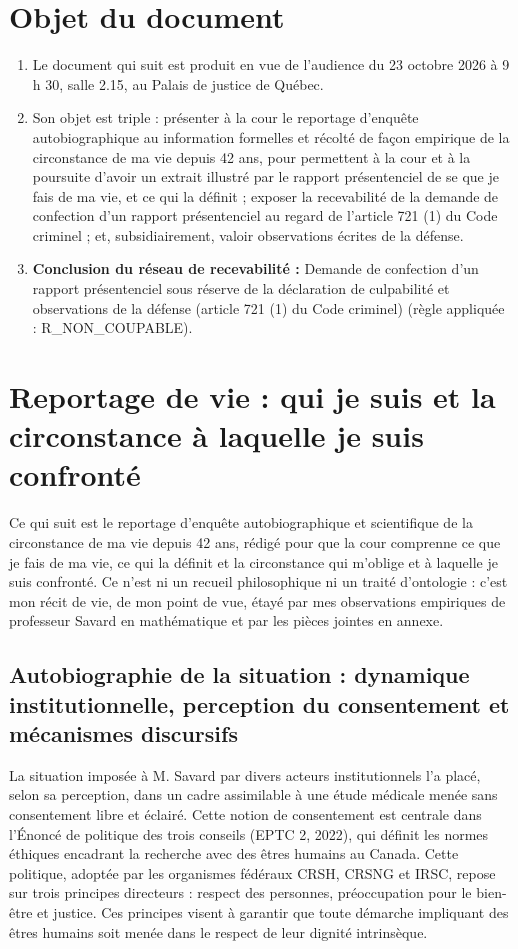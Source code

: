 \documentclass[12pt,letterpaper,oneside]{article}
\begin{document}
\section{Objet du document}
\begin{enumerate}[label=\arabic*.,leftmargin=*,itemsep=0pt,topsep=0pt]
\item Le document qui suit est produit en vue de l'audience du 23 octobre 2026 à 9 h 30, salle 2.15, au Palais de justice de Québec.

\item Son objet est triple : présenter à la cour le reportage d'enquête autobiographique au information formelles et récolté de façon empirique de la circonstance de ma vie depuis 42 ans, pour permettent à la cour et à la poursuite d'avoir un extrait illustré par le rapport présentenciel de se que je fais de ma vie, et ce qui la définit ; exposer la recevabilité de la demande de confection d'un rapport présentenciel au regard de l'article 721 (1) du Code criminel ; et, subsidiairement, valoir observations écrites de la défense.

\item \textbf{Conclusion du réseau de recevabilité :} Demande de confection d'un rapport présentenciel sous réserve de la déclaration de culpabilité et observations de la défense (article 721 (1) du Code criminel) (règle appliquée : R\_NON\_COUPABLE).
\end{enumerate}

\section{Reportage de vie : qui je suis et la circonstance à laquelle je suis confronté}
Ce qui suit est le reportage d'enquête autobiographique et scientifique de la circonstance de ma vie depuis 42 ans, rédigé pour que la cour comprenne ce que je fais de ma vie, ce qui la définit et la circonstance qui m'oblige et à laquelle je suis confronté. Ce n'est ni un recueil philosophique ni un traité d'ontologie : c'est mon récit de vie, de mon point de vue, étayé par mes observations empiriques de professeur Savard en mathématique et par les pièces jointes en annexe.

\subsection*{Autobiographie de la situation : dynamique institutionnelle, perception du consentement et mécanismes discursifs}
La situation imposée à M. Savard par divers acteurs institutionnels l’a placé, selon sa perception, dans un cadre assimilable à une étude médicale menée sans consentement libre et éclairé. Cette notion de consentement est centrale dans l’Énoncé de politique des trois conseils (EPTC 2, 2022), qui définit les normes éthiques encadrant la recherche avec des êtres humains au Canada. Cette politique, adoptée par les organismes fédéraux CRSH, CRSNG et IRSC, repose sur trois principes directeurs : respect des personnes, préoccupation pour le bien-être et justice. Ces principes visent à garantir que toute démarche impliquant des êtres humains soit menée dans le respect de leur dignité intrinsèque.
\end{document}
